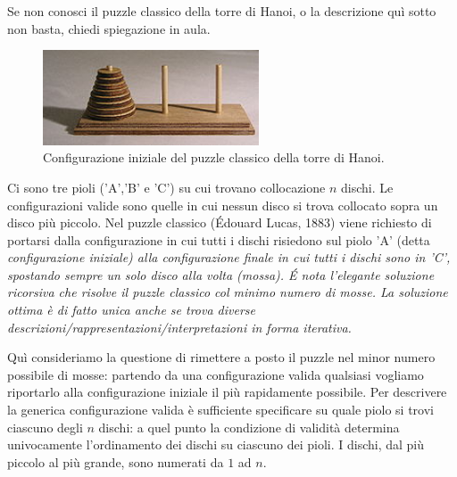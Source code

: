 \renewcommand{\nomebreve}{hanoi\_puzzle\_reset}
\renewcommand{\titolo}{Revert the Hanoi puzzle back to its initial configuration}

\introduzione{}

Se non conosci il puzzle classico della torre di Hanoi, o la descrizione quì sotto non basta, chiedi spiegazione in aula.

\begin{figure}[h!]
\begin{center}
  \noindent \includegraphics[width=0.57\textwidth]{figures/220px-Tower_of_Hanoi.jpeg}
\end{center}
\caption{Configurazione iniziale del puzzle classico della torre di Hanoi.}
\end{figure}

Ci sono tre pioli ('A','B' e 'C') su cui trovano collocazione $n$ dischi. Le configurazioni valide sono quelle in cui nessun disco si trova collocato sopra un disco più piccolo.
Nel puzzle classico (Édouard Lucas, 1883) viene richiesto di portarsi dalla configurazione in cui tutti i dischi risiedono sul piolo 'A' (detta \it{configurazione iniziale}) alla \it{configurazione finale} in cui tutti i dischi sono in 'C', spostando sempre un solo disco alla volta (mossa).
\'E nota l'elegante soluzione ricorsiva che risolve il puzzle classico col minimo numero di mosse. La soluzione ottima è di fatto unica anche se trova diverse descrizioni/rappresentazioni/interpretazioni in forma iterativa.

\begin{center}
\end{center}

Quì consideriamo la questione di rimettere a posto il puzzle nel minor numero possibile di mosse: partendo da una configurazione valida qualsiasi vogliamo riportarlo alla configurazione iniziale il più rapidamente possibile.
Per descrivere la generica configurazione valida è sufficiente specificare su quale piolo si trovi ciascuno degli $n$ dischi:
a quel punto la condizione di validità determina univocamente l'ordinamento dei dischi su ciascuno dei pioli. I dischi, dal più piccolo al più grande, sono numerati da $1$ ad $n$.

